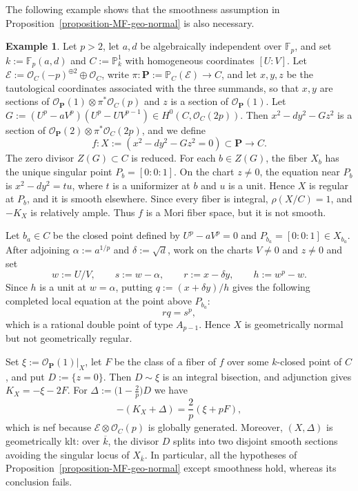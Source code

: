 \documentclass[reqno,oneside]{amsart}
\theoremstyle{definition}
\newtheorem{example}[theorem]{Example}
\theoremstyle{plain}
\numberwithin{equation}{section}
\begin{document}
The following example shows that the smoothness assumption in Proposition~\ref{proposition-MF-geo-normal} is also necessary.
\begin{example}\label{example-MF-nonsmooth}
  Let $p > 2$, let $a,d$ be algebraically independent over $\mathbb F_p$, and set $k:=\mathbb F_p(a,d)$ and $C:=\mathbb P^1_k$ with homogeneous coordinates $[U:V]$.
  Let $\mathcal E:=\mathcal O_C(-p)^{\oplus2}\oplus\mathcal O_C$, write $\pi\colon \mathbf P:=\mathbb P_C(\mathcal E)\to C$, and let $x,y,z$ be the tautological coordinates associated with the three summands, so that $x,y$ are sections of $\mathcal O_{\mathbf P}(1)\otimes\pi^*\mathcal O_C(p)$ and $z$ is a section of $\mathcal O_{\mathbf P}(1)$.
  Let $G:=(U^p-aV^p)(U^p-UV^{p-1})\in H^0(C,\mathcal O_C(2p))$.
  Then $x^2-dy^2-Gz^2$ is a section of $\mathcal O_{\mathbf P}(2)\otimes\pi^*\mathcal O_C(2p)$, and we define \[
    f\colon X:=(x^2-dy^2-Gz^2=0)\subset \mathbf P\longrightarrow C.
  \]
  The zero divisor $Z(G)\subset C$ is reduced.
  For each $b\in Z(G)$, the fiber $X_b$ has the unique singular point
  $P_b=[0:0:1]$. On the chart $z\ne0$, the equation near $P_b$ is
  $x^2-dy^2=tu$, where $t$ is a uniformizer at $b$ and $u$ is a unit.
  Hence $X$ is regular at $P_b$, and it is smooth elsewhere.
  Since every fiber is integral, $\rho(X/C)=1$, and $-K_X$ is relatively ample. Thus $f$ is a Mori fiber space,
  but it is not smooth.

  Let $b_a\in C$ be the closed point defined by $U^p-aV^p=0$ and
  $P_{b_a}=[0:0:1]\in X_{b_a}$. After adjoining $\alpha:=a^{1/p}$ and
  $\delta:=\sqrt d$, work on the charts $V\ne0$ and $z\ne0$ and set
  \[
    w:=U/V,\qquad s:=w-\alpha,\qquad r:=x-\delta y,\qquad h:=w^p-w.
  \]
  Since $h$ is a unit at $w=\alpha$, putting $q:=(x+\delta y)/h$ gives the
  following completed local equation at the point above $P_{b_a}$:
  \[
    rq=s^p,
  \]
  which is a rational double point of type $A_{p-1}$. Hence $X$ is geometrically
  normal but not geometrically regular.

  Set $\xi:=\mathcal O_{\mathbf P}(1)|_X$, let $F$ be the class of a fiber of $f$ over some $k$-closed point of $C$, and put $D:=\{z=0\}$. Then $D\sim\xi$ is an integral
  bisection, and adjunction gives $K_X=-\xi-2F$.
  For $\Delta:=\bigl(1-\frac2p\bigr)D$ we have
  \[
    -(K_X+\Delta)=\frac2p(\xi+pF),
  \]
  which is nef because $\mathcal E\otimes\mathcal O_C(p)$ is globally generated.
  Moreover, $(X,\Delta)$ is geometrically klt: over $\overline k$, the divisor $D$ splits into two disjoint smooth sections avoiding the singular locus of $X_{\overline k}$.
  In particular, all the hypotheses of Proposition~\ref{proposition-MF-geo-normal} except smoothness hold, whereas its conclusion fails.
\end{example}
\end{document}
